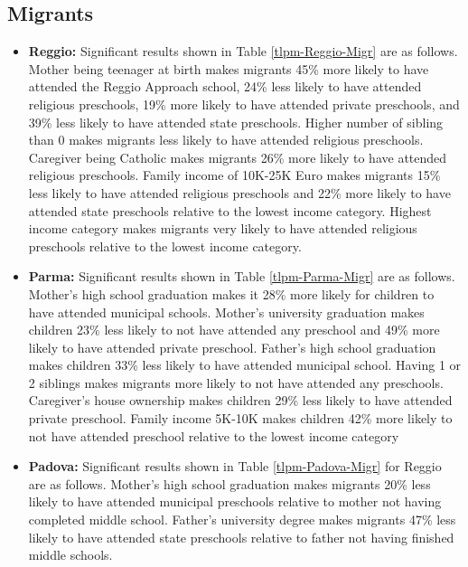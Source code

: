 \documentclass[12pt]{article}
\begin{document}
\subsection{Migrants}
\begin{itemize}
\item \textbf{Reggio:} Significant results shown in Table \ref{tlpm-Reggio-Migr} are as follows. Mother being teenager at birth makes migrants 45\% more likely to have attended the Reggio Approach school, 24\% less likely to have attended religious preschools, 19\% more likely to have attended private preschools, and 39\% less likely to have attended state preschools. Higher number of sibling than 0 makes migrants less likely to have attended religious preschools. Caregiver being Catholic makes migrants 26\% more likely to have attended religious preschools. Family income of 10K-25K Euro makes migrants 15\% less likely to have attended religious preschools and 22\% more likely to have attended state preschools relative to the lowest income category. Highest income category makes migrants very likely to have attended religious preschools relative to the lowest income category. 

\item \textbf{Parma:} Significant results shown in Table \ref{tlpm-Parma-Migr} are as follows. Mother's high school graduation makes it 28\% more likely for children to have attended municipal schools. Mother's university graduation makes children 23\% less likely to not have attended any preschool and 49\% more likely to have attended private preschool. Father's high school graduation makes children 33\% less likely to have attended municipal school. Having 1 or 2 siblings makes migrants more likely to not have attended any preschools. Caregiver's house ownership makes children 29\% less likely to have attended private preschool. Family income 5K-10K makes children 42\% more likely to not have attended preschool relative to the lowest income category

\item \textbf{Padova:} Significant results shown in Table \ref{tlpm-Padova-Migr} for Reggio are as follows. Mother's high school graduation makes migrants 20\% less likely to have attended municipal preschools relative to mother not having completed middle school. Father's university degree makes migrants 47\% less likely to have attended state preschools relative to father not having finished middle schools.
\end{itemize}
\end{document}
